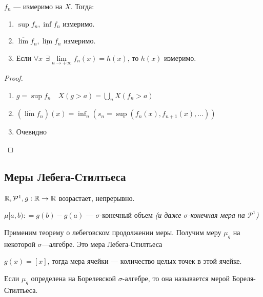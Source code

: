 \begin{theorem}
    \(f_n\) --- измеримо на \(X\). Тогда:
    \begin{enumerate}
        \item \(\sup f_n, \inf f_n\) измеримо.
        \item \(\overline \lim f_n, \underline \lim f_n\) измеримо.
        \item Если \(\forall x \ \ \exists \lim\limits_{n \to +\infty} f_n(x) = h(x)\), то \(h(x)\) измеримо.
    \end{enumerate}
\end{theorem}
\begin{proof}\itemfix
    \begin{enumerate}
        \item \(g = \sup f_n \quad X(g > a) = \bigcup_n X(f_n > a)\)
        \item \((\overline \lim f_n)(x) = \inf_n (s_n = \sup (f_n(x), f_{n+1}(x), \dots )) \)
        \item Очевидно
    \end{enumerate}
\end{proof}

\subsection*{Меры Лебега-Стилтьеса}

\(\mathbb{R}, \mathcal{P}^1, g : \mathbb{R} \to \mathbb{R}\) возрастает, непрерывно.

\(\mu[a, b) : = g(b) - g(a)\) --- \(\sigma\)-конечный объем \textit{(и даже \(\sigma\)-конечная мера на \(\mathcal{P}^1\))}


Применим теорему о лебеговском продолжении меры. Получим меру \(\mu_g\) на некоторой \(\sigma\)---алгебре. Это мера Лебега-Стилтьеса

\begin{example}
    \(g(x) = [x]\), тогда мера ячейки --- количество целых точек в этой ячейке.
\end{example}

Если \(\mu_g\) определена на Борелевской \(\sigma\)-алгебре, то она называется мерой Бореля-Стилтьеса.

